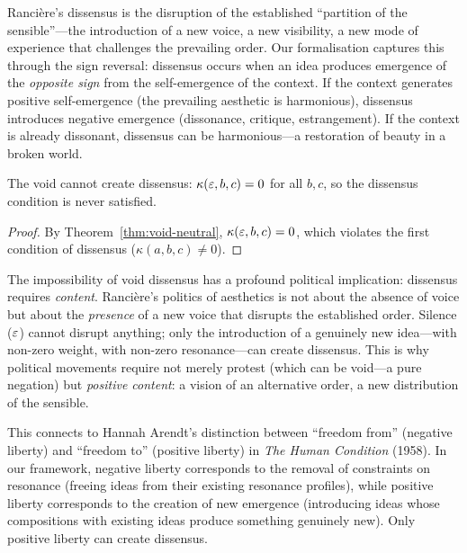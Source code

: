 \begin{interpretation}
\label{int:dissensus-ranciere}
Rancière's dissensus is the disruption of the established ``partition of
the sensible''---the introduction of a new voice, a new visibility, a new
mode of experience that challenges the prevailing order.  Our formalisation
captures this through the sign reversal: dissensus occurs when an idea
produces emergence of the \emph{opposite sign} from the self-emergence of
the context.  If the context generates positive self-emergence (the
prevailing aesthetic is harmonious), dissensus introduces negative emergence
(dissonance, critique, estrangement).  If the context is already dissonant,
dissensus can be harmonious---a restoration of beauty in a broken world.
\end{interpretation}

\begin{theorem}
\label{thm:void-no-dissensus}
The void cannot create dissensus: $\kappa(\varepsilon, b, c) = 0$ for all $b, c$, so the dissensus condition is never satisfied.
\end{theorem}

\begin{proof}
By Theorem~\ref{thm:void-neutral}, $\kappa(\varepsilon, b, c) = 0$, which violates the first condition of dissensus ($\kappa(a, b, c) \neq 0$).
\end{proof}

\begin{interpretation}
\label{interp:politics-aesthetics}
The impossibility of void dissensus has a profound political implication: dissensus requires \emph{content}.  Rancière's politics of aesthetics is not about the absence of voice but about the \emph{presence} of a new voice that disrupts the established order.  Silence ($\varepsilon$) cannot disrupt anything; only the introduction of a genuinely new idea---with non-zero weight, with non-zero resonance---can create dissensus.  This is why political movements require not merely protest (which can be void---a pure negation) but \emph{positive content}: a vision of an alternative order, a new distribution of the sensible.

This connects to Hannah Arendt's distinction between ``freedom from'' (negative liberty) and ``freedom to'' (positive liberty) in \textit{The Human Condition} (1958).  In our framework, negative liberty corresponds to the removal of constraints on resonance (freeing ideas from their existing resonance profiles), while positive liberty corresponds to the creation of new emergence (introducing ideas whose compositions with existing ideas produce something genuinely new).  Only positive liberty can create dissensus.
\end{interpretation}

